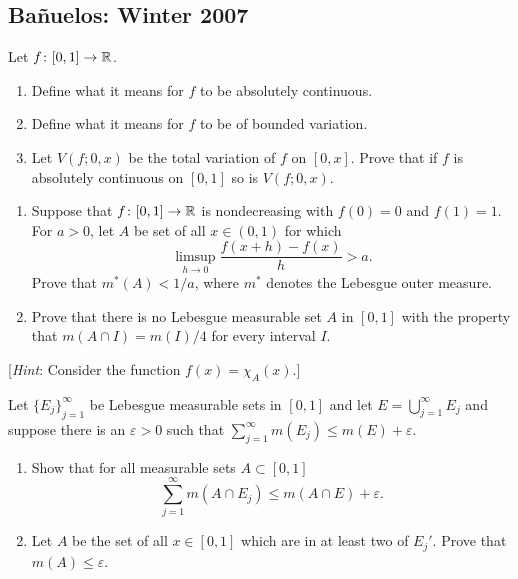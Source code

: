 \subsection{Bañuelos: Winter 2007}
\setcounter{exercise}{0}
\begin{problem}
  Let $f\colon[0,1]\to\mathbb{R}$.
  \begin{enumerate}[label=(\roman*),noitemsep]
  \item Define what it means for $f$ to be absolutely continuous.
  \item Define what it means for $f$ to be of bounded variation.
  \item Let $V(f;0,x)$ be the total variation of $f$ on $[0,x]$. Prove that
    if $f$ is absolutely continuous on $[0,1]$ so is $V(f;0,x)$.
  \end{enumerate}
\end{problem}
\begin{solution}
\end{solution}

\begin{problem}
  \hfill
  \begin{enumerate}[label=(\roman*),noitemsep]
  \item Suppose that $f\colon[0,1]\to\mathbb{R}$ is nondecreasing with $f(0)=0$
    and $f(1)=1$. For $a>0$, let $A$ be set of all $x\in(0,1)$ for which
    \[
      \limsup_{h\to 0}\frac{f(x+h)-f(x)}{h}>a.
    \]
    Prove that $m^*(A)<1/a$, where $m^*$ denotes the Lebesgue outer
    measure.
  \item Prove that there is no Lebesgue measurable set $A$ in $[0,1]$ with
    the property that $m(A\cap I)=m(I)/4$ for every interval $I$.
  \end{enumerate}
  [\emph{Hint}: Consider the function $f(x)=\chi_A(x)$.]
\end{problem}
\begin{solution}
\end{solution}

\begin{problem}
  Let ${\{E_j\}}_{j=1}^\infty$ be Lebesgue measurable sets in $[0,1]$ and
  let $E=\bigcup_{j=1}^\infty E_j$ and suppose there is an $\varepsilon>0$
  such that $\sum_{j=1}^\infty m(E_j)\leq m(E)+\varepsilon$.
  \begin{enumerate}[label=(\roman*),noitemsep]
  \item Show that for all measurable sets $A\subset[0,1]$
    \[
      \sum_{j=1}^\infty m(A\cap E_j)\leq m(A\cap E)+\varepsilon.
    \]
  \item Let $A$ be the set of all $x\in[0,1]$ which are in at least two of
    $E_j'$. Prove that $m(A)\leq\varepsilon$.
  \end{enumerate}
\end{problem}
\begin{solution}
\end{solution}

